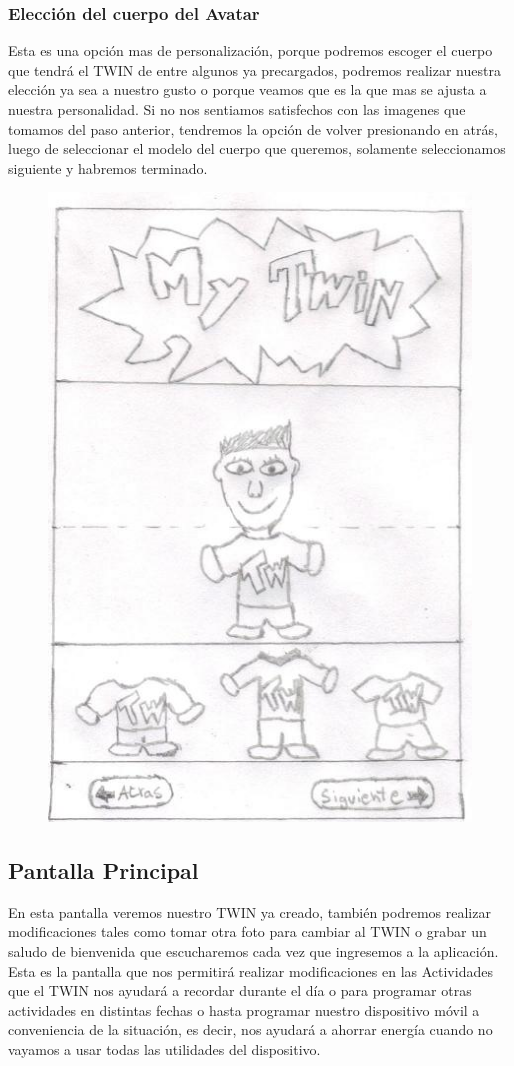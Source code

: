 \documentclass[12pt]{article}
\begin{document}
\newpage
\subsubsection{Elecci\'on del cuerpo del Avatar}
Esta es una opci\'on mas de personalizaci\'on, porque podremos escoger el cuerpo que tendr\'a el TWIN de entre algunos ya precargados, podremos realizar nuestra elecci\'on ya sea a nuestro gusto o porque veamos que es la que mas se ajusta a nuestra personalidad. 
Si no nos sentiamos satisfechos con las imagenes que tomamos del paso anterior, tendremos la opci\'on de volver presionando en atr\'as, luego de seleccionar el modelo del cuerpo que queremos, solamente seleccionamos siguiente y habremos terminado.

\begin{figure}[h]
\centering
\vspace{0.3in}\includegraphics[scale=0.5]{Twin2}
\end{figure}

\newpage
\subsection{Pantalla Principal}
En esta pantalla veremos nuestro TWIN ya creado, tambi\'en podremos realizar modificaciones tales como tomar otra foto para cambiar al TWIN o grabar un saludo de bienvenida que escucharemos cada vez que ingresemos a la aplicaci\'on. Esta es la pantalla que nos permitir\'a realizar modificaciones en las Actividades que el TWIN nos ayudar\'a a recordar durante el d\'ia o para programar otras actividades en distintas fechas o hasta programar nuestro dispositivo m\'ovil a conveniencia de la situaci\'on, es decir, nos ayudar\'a a ahorrar energ\'ia cuando no vayamos a usar todas las utilidades del dispositivo.
\end{document}
